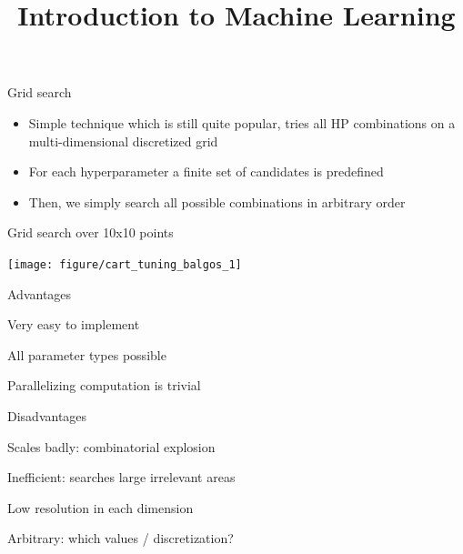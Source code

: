 \documentclass[11pt,compress,t,notes=noshow, xcolor=table]{beamer}
\title{Introduction to Machine Learning}
\institute{\href{https://compstat-lmu.github.io/lecture_i2ml/}{compstat-lmu.github.io/lecture\_i2ml}}
\date{}
\newenvironment{knitrout}{}{} %
\begin{document}










\sloppy


\begin{vbframe}{Grid search}

\begin{itemize}
\item Simple technique which is still quite popular, tries all
HP combinations on a multi-dimensional discretized grid
\item For each hyperparameter a finite set of candidates is predefined
\item Then, we simply search all possible combinations in arbitrary order
\end{itemize}

\begin{footnotesize}
\begin{center}
Grid search over 10x10 points
\end{center}
\end{footnotesize}

\begin{knitrout}\scriptsize
{}\color{fgcolor}

{\centering \texttt{[image: figure/cart\_tuning\_balgos\_1]} 

}



\end{knitrout}


\framebreak

\begin{blocki}{Advantages}
\item Very easy to implement
\item All parameter types possible
\item Parallelizing computation is trivial
\end{blocki}

\begin{blocki}{Disadvantages}
\item  Scales badly: combinatorial explosion
\item  Inefficient: searches large irrelevant areas
\item  Low resolution in each dimension
\item  Arbitrary: which values / discretization?
\end{blocki}
\end{vbframe}
\end{document}
